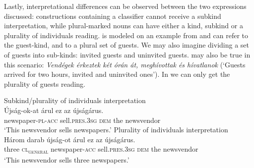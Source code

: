 \documentclass[output=paper]{langscibook}
\begin{document}
\noindent Lastly, interpretational differences can be observed between the two expressions discussed: constructions containing a classifier cannot receive a subkind interpretation, while plural-marked nouns can have either a kind, subkind or a plurality of individuals reading.   is modeled on an example from \citet{landman-rothstein-10} and can refer to the guest-kind, and to a plural set of guests. We may also imagine dividing a set of guests into sub-kinds:  invited guests and uninvited guests.  may also be true in this scenario: \textit{Vendégek érkeztek két órán át, meghívottak és hívatlanok} (`Guests arrived for two hours, invited and uninvited ones'). In  we can only get the plurality of guests reading.\largerpage[-1]

\ea \label{schv-nem:ex:30}
\ea Subkind/plurality of individuals interpretation\label{schv-nem:ex:30a}\\
\gll Újság-ok-at árul ez az újságárus.\\
newspaper-\textsc{pl}-\textsc{acc} sell.\textsc{pres}.\textsc{3sg} \textsc{dem} the  newsvendor\\ %
\glt `This newsvendor sells newspapers.'
\ex Plurality of individuals interpretation\label{schv-nem:ex:30b}\\
\gll Három darab újság-ot árul ez az újságárus.\\
three \textsc{cl\textsubscript{general}} newspaper-\textsc{acc} sell.\textsc{pres}.\textsc{3sg} \textsc{dem} the  newsvendor\\
\glt `This newsvendor sells three newspapers.'  %
\z

\end{document}
